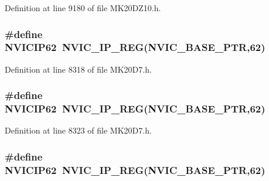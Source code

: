 Definition at line 9180 of file M\+K20\+D\+Z10.\+h.

\subsubsection[{\texorpdfstring{N\+V\+I\+C\+I\+P62}{NVICIP62}}]{\setlength{\rightskip}{0pt plus 5cm}\#define N\+V\+I\+C\+I\+P62~{\bf N\+V\+I\+C\+\_\+\+I\+P\+\_\+\+R\+EG}({\bf N\+V\+I\+C\+\_\+\+B\+A\+S\+E\+\_\+\+P\+TR},62)}\hypertarget{group___n_v_i_c___register___accessor___macros_ga6738392748d96146391040bf5782a606}{}\label{group___n_v_i_c___register___accessor___macros_ga6738392748d96146391040bf5782a606}


Definition at line 8318 of file M\+K20\+D7.\+h.

\subsubsection[{\texorpdfstring{N\+V\+I\+C\+I\+P62}{NVICIP62}}]{\setlength{\rightskip}{0pt plus 5cm}\#define N\+V\+I\+C\+I\+P62~{\bf N\+V\+I\+C\+\_\+\+I\+P\+\_\+\+R\+EG}({\bf N\+V\+I\+C\+\_\+\+B\+A\+S\+E\+\_\+\+P\+TR},62)}\hypertarget{group___n_v_i_c___register___accessor___macros_ga6738392748d96146391040bf5782a606}{}\label{group___n_v_i_c___register___accessor___macros_ga6738392748d96146391040bf5782a606}


Definition at line 8323 of file M\+K20\+D7.\+h.

\subsubsection[{\texorpdfstring{N\+V\+I\+C\+I\+P62}{NVICIP62}}]{\setlength{\rightskip}{0pt plus 5cm}\#define N\+V\+I\+C\+I\+P62~{\bf N\+V\+I\+C\+\_\+\+I\+P\+\_\+\+R\+EG}({\bf N\+V\+I\+C\+\_\+\+B\+A\+S\+E\+\_\+\+P\+TR},62)}\hypertarget{group___n_v_i_c___register___accessor___macros_ga6738392748d96146391040bf5782a606}{}\label{group___n_v_i_c___register___accessor___macros_ga6738392748d96146391040bf5782a606}


